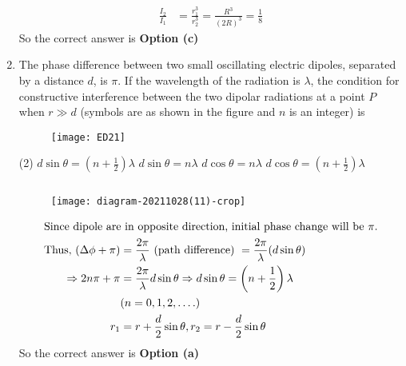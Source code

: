 \begin{enumerate}
\begin{tasks}
	\end{tasks}
\begin{answer}
	\begin{align*}
	\frac{I_{2}}{I_{1}}&=\frac{r_{1}^{3}}{r_{2}^{3}}=\frac{R^{3}}{(2 R)^{3}}=\frac{1}{8}
	\end{align*}
	So the correct answer is \textbf{Option (c)}
\end{answer}
	\item  The phase difference between two small oscillating electric dipoles, separated by a distance $d$, is $\pi$. If the wavelength of the radiation is $\lambda$, the condition for constructive interference between the two dipolar radiations at a point $P$ when $r \gg d$ (symbols are as shown in the figure and $n$ is an integer) is
	{}
	\begin{figure}[H]
		\centering
		\texttt{[image: ED21]}
	\end{figure}
	\begin{tasks}(2)
		\task[\textbf{a.}]$d \sin \theta=\left(n+\frac{1}{2}\right) \lambda$
		\task[\textbf{b.}]$d \sin \theta=n \lambda$
		\task[\textbf{c.}] $d \cos \theta=n \lambda$
		\task[\textbf{d.}] $d \cos \theta=\left(n+\frac{1}{2}\right) \lambda$
	\end{tasks}
\begin{answer}$\left. \right. $
	\begin{figure}[H]
		\centering
		\texttt{[image: diagram-20211028(11)-crop]}
	\end{figure}
	\begin{align*}
	\intertext{Since dipole are in opposite direction, initial phase
		change will be $\pi$.}
	\text{Thus, }(\Delta \phi+\pi)&=\frac{2 \pi}{\lambda}\text{ (path difference) }=\frac{2 \pi}{\lambda}(d \sin \theta)\\
	\Rightarrow 2 n \pi+\pi&=\frac{2 \pi}{\lambda} d \sin \theta \Rightarrow d \sin \theta=\left(n+\frac{1}{2}\right) \lambda\\
	&(n=0,1,2, \ldots .)\\
	r_{1}&=r+\frac{d}{2} \sin \theta, r_{2}=r-\frac{d}{2} \sin \theta
	\end{align*}
	So the correct answer is \textbf{Option (a)}
\end{answer}
\end{enumerate}
\setlength\arrayrulewidth{1pt}
